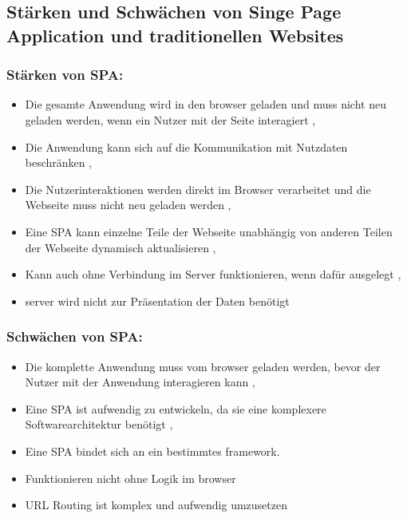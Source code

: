 \subsection{Stärken und Schwächen von Singe Page Application und traditionellen Websites}

\subsubsection*{Stärken von \ac{SPA}:}
\begin{itemize}
  \item Die gesamte Anwendung wird in den \gls{browser} geladen und muss nicht neu geladen werden, wenn ein Nutzer mit der Seite interagiert \cite{Smith2022}, \cite{Flanagan2011}
  \item Die Anwendung kann sich auf die Kommunikation mit Nutzdaten beschränken \cite{Smith2022}, \cite{Flanagan2011}
  \item Die Nutzerinteraktionen werden direkt im Browser verarbeitet und die Webseite muss nicht neu geladen werden \cite{Smith2022}, \cite{Flanagan2011}
  \item Eine \ac{SPA} kann einzelne Teile der Webseite unabhängig von anderen Teilen der Webseite dynamisch aktualisieren \cite{Smith2022}, \cite{Irudayaraj2019}
  \item Kann auch ohne Verbindung im Server funktionieren, wenn dafür ausgelegt \cite{Smith2022}, \cite{Gavrila2019}
  \item \gls{server} wird nicht zur Präsentation der Daten benötigt \cite{Flanagan2011}
\end{itemize}


\subsubsection*{Schwächen von \ac{SPA}:}

\begin{itemize}
  \item Die komplette Anwendung muss vom \gls{browser} geladen werden, bevor der Nutzer mit der Anwendung interagieren kann \cite{Smith2022}, \cite{Gavrila2019}
  \item Eine \ac{SPA} ist aufwendig zu entwickeln, da sie eine komplexere Softwarearchitektur benötigt \cite{Smith2022}, \cite{Flanagan2011}
  \item Eine \ac{SPA} bindet sich an ein bestimmtes \gls{framework}. \cite{Smith2022}
  \item Funktionieren nicht ohne Logik im \gls{browser} \cite{Smith2022}
  \item \ac{URL} Routing ist komplex und aufwendig umzusetzen \cite{Smith2022}
\end{itemize}

